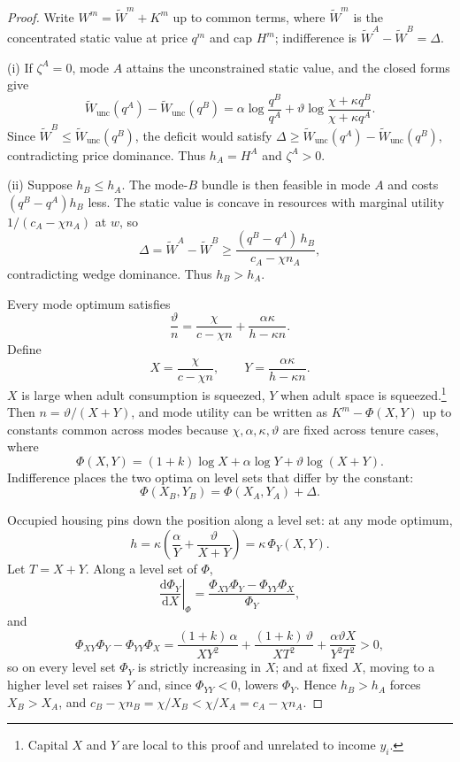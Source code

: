 \documentclass[11pt]{article}
\newcommand{\dd}{\mathrm d}
\newcommand{\1}{\mathbf 1}
\begin{document}
\begin{proof}
Write $W^m=\tilde W^m+K^m$ up to common terms, where $\tilde W^m$ is the concentrated static value at price $q^m$ and cap $H^m$; indifference is $\tilde W^A-\tilde W^B=\Delta$.

(i) If $\zeta^A=0$, mode $A$ attains the unconstrained static value, and the closed forms give
\[
\tilde W_{\mathrm{unc}}(q^A)-\tilde W_{\mathrm{unc}}(q^B)
=
\alpha\log\frac{q^B}{q^A}+\vartheta\log\frac{\chi+\kappa q^B}{\chi+\kappa q^A}.
\]
Since $\tilde W^B\le\tilde W_{\mathrm{unc}}(q^B)$, the deficit would satisfy $\Delta\ge\tilde W_{\mathrm{unc}}(q^A)-\tilde W_{\mathrm{unc}}(q^B)$, contradicting price dominance. Thus $h_A=H^A$ and $\zeta^A>0$.

(ii) Suppose $h_B\le h_A$. The mode-$B$ bundle is then feasible in mode $A$ and costs $(q^B-q^A)h_B$ less. The static value is concave in resources with marginal utility $1/(c_A-\chi n_A)$ at $w$, so
\[
\Delta=\tilde W^A-\tilde W^B
\ge
\frac{(q^B-q^A)\,h_B}{c_A-\chi n_A},
\]
contradicting wedge dominance. Thus $h_B>h_A$.

Every mode optimum satisfies
\[
\frac{\vartheta}{n}=\frac{\chi}{c-\chi n}+\frac{\alpha\kappa}{h-\kappa n}.
\]
Define
\[
X=\frac{\chi}{c-\chi n},
\qquad
Y=\frac{\alpha\kappa}{h-\kappa n}.
\]
$X$ is large when adult consumption is squeezed, $Y$ when adult space is squeezed.\footnote{Capital $X$ and $Y$ are local to this proof and unrelated to income $y_i$.}
Then $n=\vartheta/(X+Y)$, and mode utility can be written as $K^m-\Phi(X,Y)$ up to constants common across modes because $\chi,\alpha,\kappa,\vartheta$ are fixed across tenure cases, where
\[
\Phi(X,Y)=(1+k)\log X+\alpha\log Y+\vartheta\log(X+Y).
\]
Indifference places the two optima on level sets that differ by the constant:
\[
\Phi(X_B,Y_B)=\Phi(X_A,Y_A)+\Delta.
\]

Occupied housing pins down the position along a level set: at any mode optimum,
\[
h
=
\kappa\left(\frac{\alpha}{Y}+\frac{\vartheta}{X+Y}\right)
=
\kappa\,\Phi_Y(X,Y).
\]
Let $T=X+Y$. Along a level set of $\Phi$,
\[
\left.\frac{\dd \Phi_Y}{\dd X}\right|_\Phi
=
\frac{\Phi_{XY}\Phi_Y-\Phi_{YY}\Phi_X}{\Phi_Y},
\]
and
\[
\Phi_{XY}\Phi_Y-\Phi_{YY}\Phi_X
=
\frac{(1+k)\,\alpha}{XY^2}
+
\frac{(1+k)\,\vartheta}{XT^2}
+
\frac{\alpha\vartheta X}{Y^2T^2}
>0,
\]
so on every level set $\Phi_Y$ is strictly increasing in $X$; and at fixed $X$, moving to a higher level set raises $Y$ and, since $\Phi_{YY}<0$, lowers $\Phi_Y$. Hence $h_B>h_A$ forces $X_B>X_A$, and $c_B-\chi n_B=\chi/X_B<\chi/X_A=c_A-\chi n_A$.


\end{proof}
\end{document}
